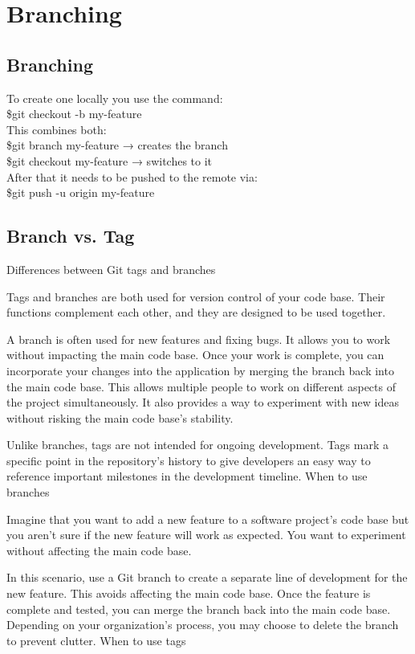 \chapter{Branching}
\chapteroverlay
\section{Branching}
To create one locally you use the command:\\
\$git checkout -b my-feature\\
This combines both:\\
\$git branch my-feature → creates the branch\\
\$git checkout my-feature → switches to it\\

After that it needs to be pushed to the remote via:\\
\$git push -u origin my-feature\\

\section{Branch vs. Tag}
Differences between Git tags and branches

Tags and branches are both used for version control of your code base. Their functions complement each other, and they are designed to be used together.

A branch is often used for new features and fixing bugs. It allows you to work without impacting the main code base. Once your work is complete, you can incorporate your changes into the application by merging the branch back into the main code base. This allows multiple people to work on different aspects of the project simultaneously. It also provides a way to experiment with new ideas without risking the main code base's stability.

Unlike branches, tags are not intended for ongoing development. Tags mark a specific point in the repository’s history to give developers an easy way to reference important milestones in the development timeline.
When to use branches

Imagine that you want to add a new feature to a software project’s code base but you aren’t sure if the new feature will work as expected. You want to experiment without affecting the main code base.

In this scenario, use a Git branch to create a separate line of development for the new feature. This avoids affecting the main code base. Once the feature is complete and tested, you can merge the branch back into the main code base. Depending on your organization’s process, you may choose to delete the branch to prevent clutter.
When to use tags

